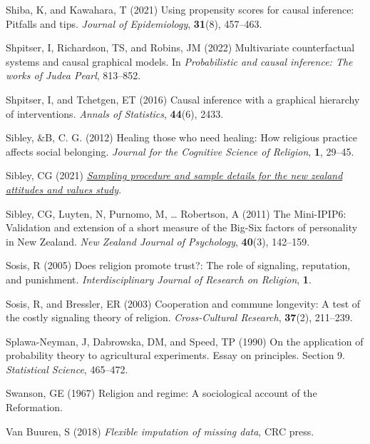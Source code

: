 \documentclass[
  single column]{article}
\newlength{\cslhangindent}
\newenvironment{CSLReferences}[2] %
 {\begin{list}{}{%
  \setlength{\itemindent}{0pt}
  \setlength{\leftmargin}{0pt}
  \setlength{\parsep}{0pt}
  \ifodd #1
   \setlength{\leftmargin}{\cslhangindent}
   \setlength{\itemindent}{-1\cslhangindent}
  \fi
  \setlength{\itemsep}{#2\baselineskip}}}
 {\end{list}}
\begin{document}
\begin{CSLReferences}{1}{0}
Shiba, K, and Kawahara, T (2021) Using propensity scores for causal
inference: Pitfalls and tips. \emph{Journal of Epidemiology},
\textbf{31}(8), 457--463.

Shpitser, I, Richardson, TS, and Robins, JM (2022) Multivariate
counterfactual systems and causal graphical models. In
\emph{Probabilistic and causal inference: The works of {J}udea {P}earl},
813--852.

Shpitser, I, and Tchetgen, ET (2016) Causal inference with a graphical
hierarchy of interventions. \emph{Annals of Statistics}, \textbf{44}(6),
2433.

Sibley, \&B, C. G. (2012) Healing those who need healing: How religious
practice affects social belonging. \emph{Journal for the Cognitive
Science of Religion}, \textbf{1}, 29--45.

Sibley, CG (2021)
\emph{\href{https://doi.org/10.31234/osf.io/wgqvy}{Sampling procedure
and sample details for the new zealand attitudes and values study}}.

Sibley, CG, Luyten, N, Purnomo, M, \ldots{} Robertson, A (2011) The
Mini-IPIP6: Validation and extension of a short measure of the Big-Six
factors of personality in New Zealand. \emph{New Zealand Journal of
Psychology}, \textbf{40}(3), 142--159.

Sosis, R (2005) Does religion promote trust?: The role of signaling,
reputation, and punishment. \emph{Interdisciplinary Journal of Research
on Religion}, \textbf{1}.

Sosis, R, and Bressler, ER (2003) Cooperation and commune longevity: A
test of the costly signaling theory of religion. \emph{Cross-Cultural
Research}, \textbf{37}(2), 211--239.

Splawa-Neyman, J, Dabrowska, DM, and Speed, TP (1990) On the application
of probability theory to agricultural experiments. Essay on principles.
Section 9. \emph{Statistical Science}, 465--472.

Swanson, GE (1967) Religion and regime: A sociological account of the
{R}eformation.

Van Buuren, S (2018) \emph{Flexible imputation of missing data}, CRC
press.


\end{CSLReferences}
\end{document}
